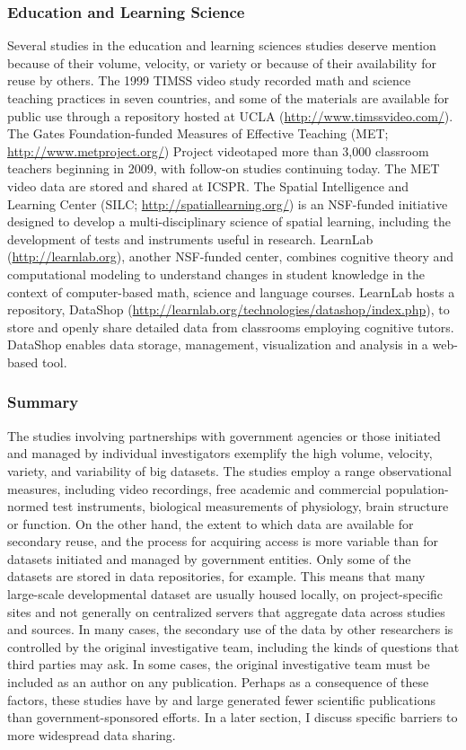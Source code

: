 \documentclass[letterpaper,man,apacite]{apa6}
\begin{document}
\subsubsection{Education and Learning Science}

Several studies in the education and learning sciences studies deserve mention because of their volume, velocity, or variety or because of their availability for reuse by others.
The 1999 TIMSS video study recorded math and science teaching practices in seven countries, and some of the materials are available for public use through a repository hosted at UCLA (\url{http://www.timssvideo.com/}).
The Gates Foundation-funded Measures of Effective Teaching (MET; \url{http://www.metproject.org/}) Project videotaped more than 3,000 classroom teachers beginning in 2009, with follow-on studies continuing today.
The MET video data are stored and shared at ICSPR.
The Spatial Intelligence and Learning Center (SILC; \url{http://spatiallearning.org/}) is an NSF-funded initiative designed to develop a multi-disciplinary science of spatial learning, including the development of tests and instruments useful in research.
LearnLab (\url{http://learnlab.org}), another NSF-funded center, combines cognitive theory and computational modeling to understand changes in student knowledge in the context of computer-based math, science and language courses. 
LearnLab hosts a repository, DataShop (\url{http://learnlab.org/technologies/datashop/index.php}), to store and openly share detailed data from classrooms employing cognitive tutors.
DataShop enables data storage, management, visualization and analysis in a web-based tool.

\subsubsection{Summary}

The studies involving partnerships with government agencies or those initiated and managed by individual investigators exemplify the high volume, velocity, variety, and variability of big datasets.
The studies employ a range observational measures, including video recordings, free academic and commercial population-normed test instruments, biological measurements of physiology, brain structure or function.
On the other hand, the extent to which data are available for secondary reuse, and the process for acquiring access is more variable than for datasets initiated and managed by government entities.
Only some of the datasets are stored in data repositories, for example.
This means that many large-scale developmental dataset are usually housed locally, on project-specific sites and not generally on centralized servers that aggregate data across studies and sources.
In many cases, the secondary use of the data by other researchers is controlled by the original investigative team, including the kinds of questions that third parties may ask.
In some cases, the original investigative team must be included as an author on any publication.
Perhaps as a consequence of these factors, these studies have by and large generated fewer scientific publications than government-sponsored efforts.
In a later section, I discuss specific barriers to more widespread data sharing.
\end{document}
